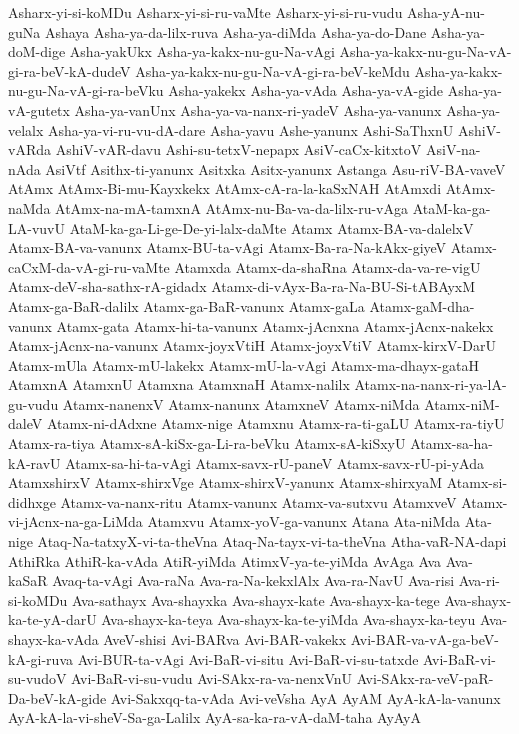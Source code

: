{Asharx-yi-si-koMDu
Asharx-yi-si-ru-vaMte
Asharx-yi-si-ru-vudu
Asha-yA-nu-guNa
Ashaya
Asha-ya-da-lilx-ruva
Asha-ya-diMda
Asha-ya-do-Dane
Asha-ya-doM-dige
Asha-yakUkx
Asha-ya-kakx-nu-gu-Na-vAgi
Asha-ya-kakx-nu-gu-Na-vA-gi-ra-beV-kA-dudeV
Asha-ya-kakx-nu-gu-Na-vA-gi-ra-beV-keMdu
Asha-ya-kakx-nu-gu-Na-vA-gi-ra-beVku
Asha-yakekx
Asha-ya-vAda
Asha-ya-vA-gide
Asha-ya-vA-gutetx
Asha-ya-vanUnx
Asha-ya-va-nanx-ri-yadeV
Asha-ya-vanunx
Asha-ya-velalx
Asha-ya-vi-ru-vu-dA-dare
Asha-yavu
Ashe-yanunx
Ashi-SaThxnU
AshiV-vARda
AshiV-vAR-davu
Ashi-su-tetxV-nepapx
AsiV-caCx-kitxtoV
AsiV-na-nAda
AsiVtf
Asithx-ti-yanunx
Asitxka
Asitx-yanunx
Astanga
Asu-riV-BA-vaveV
AtAmx
AtAmx-Bi-mu-Kayxkekx
AtAmx-cA-ra-la-kaSxNAH
AtAmxdi
AtAmx-naMda
AtAmx-na-mA-tamxnA
AtAmx-nu-Ba-va-da-lilx-ru-vAga
AtaM-ka-ga-LA-vuvU
AtaM-ka-ga-Li-ge-De-yi-lalx-daMte
Atamx
Atamx-BA-va-dalelxV
Atamx-BA-va-vanunx
Atamx-BU-ta-vAgi
Atamx-Ba-ra-Na-kAkx-giyeV
Atamx-caCxM-da-vA-gi-ru-vaMte
Atamxda
Atamx-da-shaRna
Atamx-da-va-re-vigU
Atamx-deV-sha-sathx-rA-gidadx
Atamx-di-vAyx-Ba-ra-Na-BU-Si-tABAyxM
Atamx-ga-BaR-dalilx
Atamx-ga-BaR-vanunx
Atamx-gaLa
Atamx-gaM-dha-vanunx
Atamx-gata
Atamx-hi-ta-vanunx
Atamx-jAcnxna
Atamx-jAcnx-nakekx
Atamx-jAcnx-na-vanunx
Atamx-joyxVtiH
Atamx-joyxVtiV
Atamx-kirxV-DarU
Atamx-mUla
Atamx-mU-lakekx
Atamx-mU-la-vAgi
Atamx-ma-dhayx-gataH
AtamxnA
AtamxnU
Atamxna
AtamxnaH
Atamx-nalilx
Atamx-na-nanx-ri-ya-lA-gu-vudu
Atamx-nanenxV
Atamx-nanunx
AtamxneV
Atamx-niMda
Atamx-niM-daleV
Atamx-ni-dAdxne
Atamx-nige
Atamxnu
Atamx-ra-ti-gaLU
Atamx-ra-tiyU
Atamx-ra-tiya
Atamx-sA-kiSx-ga-Li-ra-beVku
Atamx-sA-kiSxyU
Atamx-sa-ha-kA-ravU
Atamx-sa-hi-ta-vAgi
Atamx-savx-rU-paneV
Atamx-savx-rU-pi-yAda
AtamxshirxV
Atamx-shirxVge
Atamx-shirxV-yanunx
Atamx-shirxyaM
Atamx-si-didhxge
Atamx-va-nanx-ritu
Atamx-vanunx
Atamx-va-sutxvu
AtamxveV
Atamx-vi-jAcnx-na-ga-LiMda
Atamxvu
Atamx-yoV-ga-vanunx
Atana
Ata-niMda
Ata-nige
Ataq-Na-tatxyX-vi-ta-theVna
Ataq-Na-tayx-vi-ta-theVna
Atha-vaR-NA-dapi
AthiRka
AthiR-ka-vAda
AtiR-yiMda
AtimxV-ya-te-yiMda
AvAga
Ava
Ava-kaSaR
Avaq-ta-vAgi
Ava-raNa
Ava-ra-Na-kekxlAlx
Ava-ra-NavU
Ava-risi
Ava-ri-si-koMDu
Ava-sathayx
Ava-shayxka
Ava-shayx-kate
Ava-shayx-ka-tege
Ava-shayx-ka-te-yA-darU
Ava-shayx-ka-teya
Ava-shayx-ka-te-yiMda
Ava-shayx-ka-teyu
Ava-shayx-ka-vAda
AveV-shisi
Avi-BARva
Avi-BAR-vakekx
Avi-BAR-va-vA-ga-beV-kA-gi-ruva
Avi-BUR-ta-vAgi
Avi-BaR-vi-situ
Avi-BaR-vi-su-tatxde
Avi-BaR-vi-su-vudoV
Avi-BaR-vi-su-vudu
Avi-SAkx-ra-va-nenxVnU
Avi-SAkx-ra-veV-paR-Da-beV-kA-gide
Avi-Sakxqq-ta-vAda
Avi-veVsha
AyA
AyAM
AyA-kA-la-vanunx
AyA-kA-la-vi-sheV-Sa-ga-Lalilx
AyA-sa-ka-ra-vA-daM-taha
AyAyA
}
